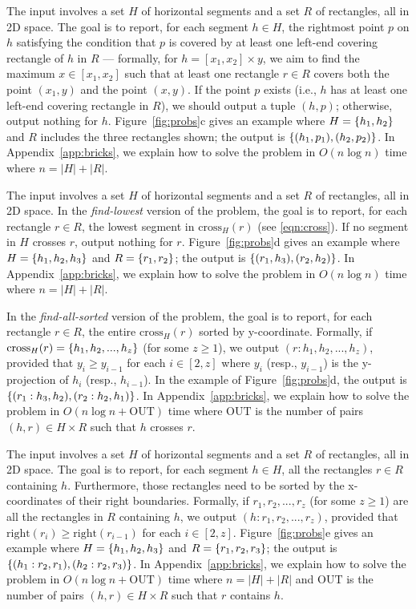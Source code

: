 \documentclass[sigconf]{acmart}
\def\vgap{\vspace{1mm}}
\def\extraspacing{\vspace{2mm} \noindent}
\def\xright{\mathrm{right}}
\def\cross{\mathrm{cross}}
\def\out{\mathrm{OUT}}
\begin{document}
\extraspacing {\bf Problem $\bm{\mathscr{C}}$.} The input involves a set $H$ of horizontal segments and a set $R$ of rectangles, all in 2D space. The goal is to report, for each segment $h \in H$, the rightmost point $p$ on $h$ satisfying the condition that $p$ is covered by at least one left-end covering rectangle of $h$ in $R$ --- formally, for $h = [x_1, x_2] \times y$, we aim to find the maximum $x \in [x_1, x_2]$ such that at least one rectangle $r \in R$ covers both the point $(x_1, y)$ and the point $(x, y)$. If the point $p$ exists (i.e., $h$ has at least one left-end covering rectangle in $R$), we should output a tuple $(h, p)$; otherwise, output nothing for $h$. Figure~\ref{fig:probs}c gives an example where $H = \{h_1, h_2\}$ and $R$ includes the three rectangles shown; the output is $\{(h_1, p_1), (h_2, p_2)\}$. In Appendix~\ref{app:bricks}, we explain how to solve the problem in $O(n \log n)$ time where $n = |H| + |R|$.

\extraspacing {\bf Problem $\bm{\mathscr{D}}$.} The input involves a set $H$ of horizontal segments and a set $R$ of rectangles, all in 2D space. In the {\em find-lowest} version of the problem, the goal is to report, for each rectangle $r \in R$, the lowest segment in $\cross_H(r)$ (see \eqref{eqn:cross}). If no segment in $H$ crosses $r$, output nothing for $r$.  Figure~\ref{fig:probs}d gives an example where $H = \{h_1, h_2, h_3\}$ and $R = \{r_1, r_2\}$; the output is $\{(r_1, h_3), (r_2, h_2)\}$. In Appendix~\ref{app:bricks}, we explain how to solve the problem in $O(n \log n)$ time where $n = |H| + |R|$.

\vgap

In the {\em find-all-sorted} version of the problem, the goal is to report, for each rectangle $r \in R$, the entire $\cross_H(r)$ sorted by y-coordinate. Formally, if $\cross_H(r) = \set{h_1, h_2, ..., h_z}$ (for some $z \ge 1$), we output $(r: h_1, h_2, ..., h_z)$, provided that $y_i \ge y_{i-1}$ for each $i \in [2, z]$ where $y_i$ (resp., $y_{i-1}$) is the y-projection of $h_i$ (resp., $h_{i-1}$). In the example of Figure~\ref{fig:probs}d, the output is $\{(r_1: h_3, h_2), (r_2: h_2, h_1)\}$. In Appendix~\ref{app:bricks}, we explain how to solve the problem in $O(n \log n + \out)$ time where $\out$ is the number of pairs $(h, r) \in H \times R$ such that $h$ crosses $r$.


\extraspacing {\bf Problem $\bm{\mathscr{E}}$.} The input involves a set $H$ of horizontal segments and a set $R$ of rectangles, all in 2D space. The goal is to report, for each segment $h \in H$, all the rectangles $r \in R$ containing $h$. Furthermore, those rectangles need to be sorted by the x-coordinates of their right boundaries. Formally, if $r_1, r_2, ..., r_z$ (for some $z \ge 1$) are all the rectangles in $R$ containing $h$, we output $(h: r_1, r_2, ..., r_z)$, provided that $\xright(r_i) \ge \xright(r_{i-1})$ for each $i \in [2, z]$. Figure~\ref{fig:probs}e gives an example where $H = \{h_1, h_2, h_3\}$ and $R = \{r_1, r_2, r_3\}$; the output is $\{(h_1: r_2, r_1), (h_2: r_2, r_3)\}$. In Appendix~\ref{app:bricks}, we explain how to solve the problem in $O(n \log n + \out)$ time where $n = |H| + |R|$ and $\out$ is the number of pairs $(h, r) \in H \times R$ such that $r$ contains $h$.
\end{document}
